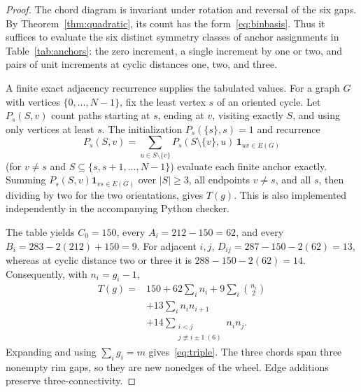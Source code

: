 \documentclass[9pt,a4paper,twocolumn]{extarticle}
\begin{document}
\begin{proof}
The chord diagram is invariant under rotation and reversal of the six gaps. By Theorem~\ref{thm:quadratic}, its count has the form~\eqref{eq:binbasis}. Thus it suffices to evaluate the six distinct symmetry classes of anchor assignments in Table~\ref{tab:anchors}: the zero increment, a single increment by one or two, and pairs of unit increments at cyclic distances one, two, and three.

A finite exact adjacency recurrence supplies the tabulated values. For a graph $G$ with vertices $\{0,\dots,N-1\}$, fix the least vertex $s$ of an oriented cycle. Let $P_s(S,v)$ count paths starting at $s$, ending at $v$, visiting exactly $S$, and using only vertices at least $s$. The initialization $P_s(\{s\},s)=1$ and recurrence
\begin{equation}\label{eq:DP}
P_s(S,v)=\sum_{u\in S\setminus\{v\}}P_s(S\setminus\{v\},u)\,\mathbf 1_{uv\in E(G)}
\end{equation}
(for $v\ne s$ and $S\subseteq\{s,s+1,\dots,N-1\}$) evaluate each finite anchor exactly. Summing $P_s(S,v)\mathbf1_{vs\in E(G)}$ over $|S|\ge3$, all endpoints $v\ne s$, and all $s$, then dividing by two for the two orientations, gives $T(g)$. This is also implemented independently in the accompanying Python checker.

The table yields $C_0=150$, every $A_i=212-150=62$, and every $B_i=283-2(212)+150=9$. For adjacent $i,j$, $D_{ij}=287-150-2(62)=13$, whereas at cyclic distance two or three it is $288-150-2(62)=14$. Consequently, with $n_i=g_i-1$,
\begin{equation}\label{eq:interpol}
\begin{aligned}
T(g)={}&150+62\sum_i n_i
             +9\sum_i\binom{n_i}{2}\\
       &+13\sum_i n_i n_{i+1}\\
       &+14\!\!\sum_{\substack{i<j\\j\not\equiv i\pm1\ (6)}}n_i n_j.
\end{aligned}
\end{equation}
Expanding and using $\sum_i g_i=m$ gives~\eqref{eq:triple}. The three chords span three nonempty rim gaps, so they are new nonedges of the wheel. Edge additions preserve three-connectivity.\end{proof}
\end{document}
